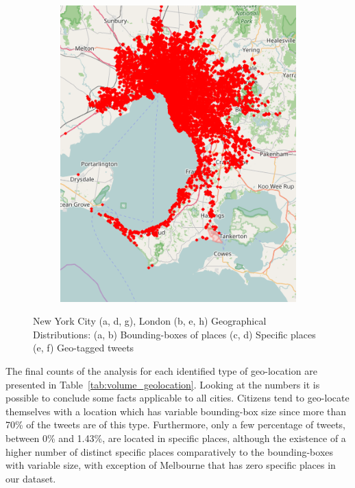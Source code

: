 \begin{figure}[!htbp]
	\quad
	\begin{subfigure}[htbp]{0.3\textwidth}
		\centering
		\includegraphics[width=1\linewidth]{figures/melbourne_points.png}
		\caption{}
		\label{subfig:melbourne_points}
	\end{subfigure}
	
	\caption[Exploratory analysis in English-speaking cities]{New York City (a, d, g), London (b, e, h) Geographical Distributions: (a, b) Bounding-boxes of places (c, d) Specific places (e, f) Geo-tagged tweets}
	\label{fig:nyc_london_melbourne_geographical_distribution}
\end{figure}

The final counts of the analysis for each identified type of geo-location are presented in Table~\ref{tab:volume_geolocation}. Looking at the numbers it is possible to conclude some facts applicable to all cities. Citizens tend to geo-locate themselves with a location which has variable bounding-box size since more than 70\% of the tweets are of this type. Furthermore, only a few percentage of tweets, between 0\% and 1.43\%, are located in specific places, although the existence of a higher number of distinct specific places comparatively to the bounding-boxes with variable size, with exception of Melbourne that has zero specific places in our dataset.


